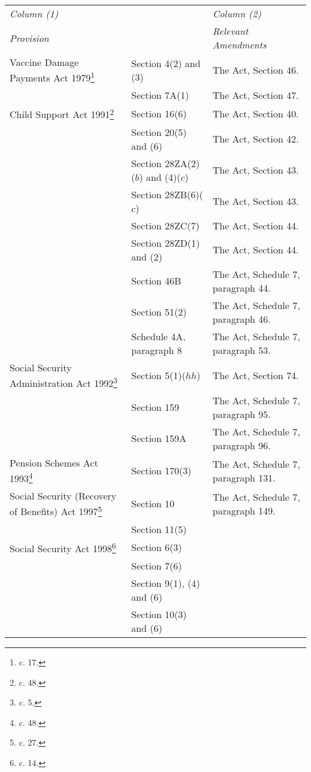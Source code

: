 \documentclass[12pt,a4paper]{article}
\begin{document}
\renewcommand\parthead{--- Schedule 1}

{\footnotesize
\begin{longtable}{p{150pt}p{102pt}p{102pt}}
\hline
\itshape Column (1) & & \itshape Column (2)\\
\itshape Provision & & \itshape Relevant Amendments\\
\hline
\endhead
\hline
\endlastfoot
Vaccine Damage Payments Act 1979\footnote{\frenchspacing 1979 c. 17.}&Section 4(2) and (3)&The Act, Section 46.\\
&Section 7A(1)&The Act, Section 47.\\
Child Support Act 1991\footnote{\frenchspacing 1991 c. 48.}&Section 16(6)&The Act, Section 40.\\
&Section 20(5) and (6)&The Act, Section 42.\\
&Section 28ZA(2)($b$) and (4)($c$)&The Act, Section 43.\\
&Section 28ZB(6)($c$)&The Act, Section 43.\\
&Section 28ZC(7)&The Act, Section 44.\\
&Section 28ZD(1) and (2)&The Act, Section 44.\\
&Section 46B&The Act, Schedule 7, paragraph 44.\\
&Section 51(2)&The Act, Schedule 7, paragraph 46.\\
&Schedule 4A, paragraph 8&The Act, Schedule 7, paragraph 53.\\
Social Security Administration Act 1992\footnote{\frenchspacing 1992 c. 5.}&Section 5(1)($hh$)&The Act, Section 74.\\
&Section 159&The Act, Schedule 7, paragraph 95.\\
&Section 159A&The Act, Schedule 7, paragraph 96.\\
Pension Schemes Act 1993\footnote{\frenchspacing 1993 c. 48.}&Section 170(3)&The Act, Schedule 7, paragraph 131.\\
Social Security (Recovery of Benefits) Act 1997\footnote{\frenchspacing 1997 c. 27.}&Section 10&The Act, Schedule 7, paragraph 149.\\
&Section 11(5)\\
Social Security Act 1998\footnote{\frenchspacing 1998 c. 14.}&Section 6(3)\\
&Section 7(6)\\
&Section 9(1), (4) and (6)\\
&Section 10(3) and (6)\\

\end{longtable}}
\end{document}
